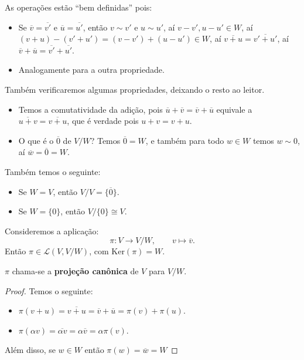 \documentclass[11pt,twoside,a4paper]{book}
\begin{document}
\begin{observacao}
As operações estão ``bem definidas'' pois:
\begin{itemize}
\item Se $\overline{v}=\overline{v'}$ e $\overline{u}=\overline{u'}$, então $v\sim v'$ e $u\sim u'$, aí $v-v',u-u'\in W$, aí $(v+u)-(v'+u')=(v-v')+(u-u')\in W$, aí $\overline{v+u}=\overline{v'+u'}$, aí $\overline{v}+\overline{u}=\overline{v'}+\overline{u'}$.
\item Analogamente para a outra propriedade.
\end{itemize}
Também verificaremos algumas propriedades, deixando o resto ao leitor.
\begin{itemize}
\item Temos a comutatividade da adição, pois $\overline{u}+\overline{v}=\overline{v}+\overline{u}$ equivale a $\overline{u+v}=\overline{v+u}$, que é verdade pois $u+v=v+u$.
\item O que é o $\overline{0}$ de $V/W$? Temos $\overline{0}=W$, e também para todo $w\in W$ temos $w\sim 0$, aí $\overline{w}=\overline{0}=W$.
\end{itemize}
Também temos o seguinte:
\begin{itemize}
\item Se $W=V$, então $V/V=\{\overline{0}\}$.
\item Se $W=\{0\}$, então $V/\{0\}\cong V$.
\end{itemize}
\end{observacao}

\begin{proposicao}
Consideremos a aplicação:
\[
\pi:V\rightarrow V/W,\quad\quad v\mapsto\overline{v}.
\]
Então $\pi\in\mathcal{L}(V,V/W)$, com $\mathrm{Ker}(\pi)=W$.
\end{proposicao}

\begin{notacao}
$\pi$ chama-se a \textbf{projeção canônica} de $V$ para $V/W$.
\end{notacao}

\begin{proof}
Temos o seguinte:
\begin{itemize}
\item $\pi(v+u)=\overline{v+u}=\overline{v}+\overline{u}=\pi(v)+\pi(u)$.
\item $\pi(\alpha v)=\overline{\alpha v}=\alpha\overline{v}=\alpha\pi(v)$.
\end{itemize}
Além disso, se $w\in W$ então $\pi(w)=\overline{w}=W$
\end{proof}
\end{document}
